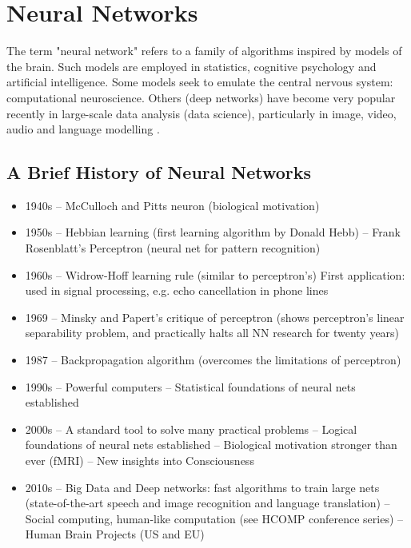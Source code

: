 \section{Neural Networks}

The term "neural network" refers to a family of algorithms inspired by models of the brain.
Such models are employed in statistics, cognitive psychology and artificial intelligence.
Some models seek to emulate the central nervous system: computational neuroscience.
Others (deep networks) have become very popular recently in large-scale data analysis
(data science), particularly in image, video, audio and language modelling \cite{Garcez2019}. 


\subsection{A Brief History of Neural Networks}

\begin{itemize}
    \item
1940s
– McCulloch and Pitts neuron (biological motivation)
    \item
1950s
– Hebbian learning (first learning algorithm by
Donald Hebb)
– Frank Rosenblatt’s Perceptron (neural net for
pattern recognition)
    \item
1960s
– Widrow-Hoff learning rule (similar to perceptron’s)
First application: used in signal processing, e.g.
echo cancellation in phone lines
    \item
1969
– Minsky and Papert’s critique of perceptron (shows
perceptron’s linear separability problem, and
practically halts all NN research for twenty years)
    \item
1987
– Backpropagation algorithm (overcomes the
limitations of perceptron)
    \item
1990s
– Powerful computers
– Statistical foundations of neural nets established

    \item
2000s
– A standard tool to solve many practical problems
– Logical foundations of neural nets established
– Biological motivation stronger than ever (fMRI)
– New insights into Consciousness
    \item
2010s
– Big Data and Deep networks: fast algorithms to
train large nets (state-of-the-art speech and image
recognition and language translation)
– Social computing, human-like computation (see
HCOMP conference series)
– Human Brain Projects (US and EU)
\end{itemize}



